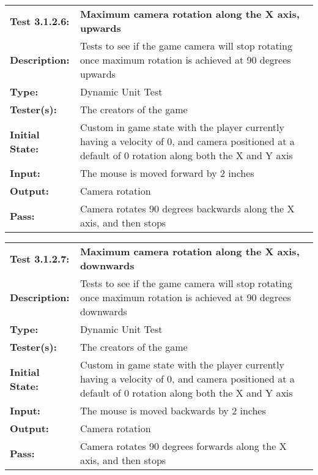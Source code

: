 \documentclass[12pt, titlepage]{article}
\begin{document}
\begin{enumerate}
\begin{mdframed}[linewidth=1pt]
\begin{tabularx}{\textwidth}{@{}p{3cm}X@{}}
{\bf Test 3.1.2.6:} & {\bf Maximum camera rotation along the X axis, upwards}\\[\baselineskip]
{\bf Description:} & Tests to see if the game camera will stop rotating once maximum rotation is achieved at 90 degrees upwards\\[0.5\baselineskip]
{\bf Type:} & Dynamic Unit Test\\[0.5\baselineskip]
{\bf Tester(s):} & The creators of the game\\[0.5\baselineskip]
{\bf Initial State:} & Custom in game state with the player currently having a velocity of 0, and camera positioned at a default of 0 rotation along both the X and Y axis\\[0.5\baselineskip]
{\bf Input:} & The mouse is moved forward by 2 inches\\[0.5\baselineskip]
{\bf Output:} & Camera rotation\\[0.5\baselineskip]
{\bf Pass:} & Camera rotates 90 degrees backwards along the X axis, and then stops
\end{tabularx}
\end{mdframed}

\begin{mdframed}[linewidth=1pt]
\begin{tabularx}{\textwidth}{@{}p{3cm}X@{}}
{\bf Test 3.1.2.7:} & {\bf Maximum camera rotation along the X axis, downwards}\\[\baselineskip]
{\bf Description:} & Tests to see if the game camera will stop rotating once maximum rotation is achieved at 90 degrees downwards\\[0.5\baselineskip]
{\bf Type:} & Dynamic Unit Test\\[0.5\baselineskip]
{\bf Tester(s):} & The creators of the game\\[0.5\baselineskip]
{\bf Initial State:} & Custom in game state with the player currently having a velocity of 0, and camera positioned at a default of 0 rotation along both the X and Y axis\\[0.5\baselineskip]
{\bf Input:} & The mouse is moved backwards by 2 inches\\[0.5\baselineskip]
{\bf Output:} & Camera rotation\\[0.5\baselineskip]
{\bf Pass:} & Camera rotates 90 degrees forwards along the X axis, and then stops
\end{tabularx}
\end{mdframed}


\end{enumerate}
\end{document}
